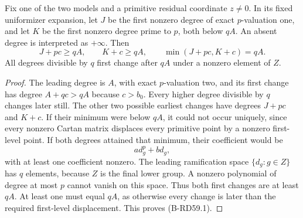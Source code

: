 \begin{lemma}
\label{lem:B-RD59-final-bound}
Fix one of the two models and a primitive residual coordinate
$z\ne0$. In its fixed uniformizer expansion, let $J$ be the first
nonzero degree of exact $p$-valuation one, and let $K$ be the first
nonzero degree prime to $p$, both below $qA$. An absent degree is
interpreted as $+\infty$. Then
\[
          J+pc\ge qA,\qquad K+c\ge qA,\qquad
                       \min(J+pc,K+c)=qA.              \tag{B-RD59.1}
\]
All degrees divisible by $q$ first change after $qA$ under a
nonzero element of $Z$.
\end{lemma}
\begin{proof}
The leading degree is $A$, with exact $p$-valuation two, and its
first change has degree $A+qc>qA$ because $c>b_0$.
Every higher degree divisible by $q$ changes later still.
The other two possible earliest changes have degrees $J+pc$ and
$K+c$. If their minimum were below $qA$, it could not occur
uniquely, since every nonzero Cartan matrix displaces every primitive
point by a nonzero first-level point. If both degrees attained that
minimum, their coefficient would be
\[
                           a d_g^p+b d_g,
\]
with at least one coefficient nonzero. The leading ramification
space $\{d_g:g\in Z\}$ has $q$ elements, because $Z$ is the final
lower group. A nonzero polynomial of degree at most $p$ cannot
vanish on this space. Thus both first changes are at least $qA$.
At least one must equal $qA$, as otherwise every change is later
than the required first-level displacement. This proves (B-RD59.1).
\end{proof}

